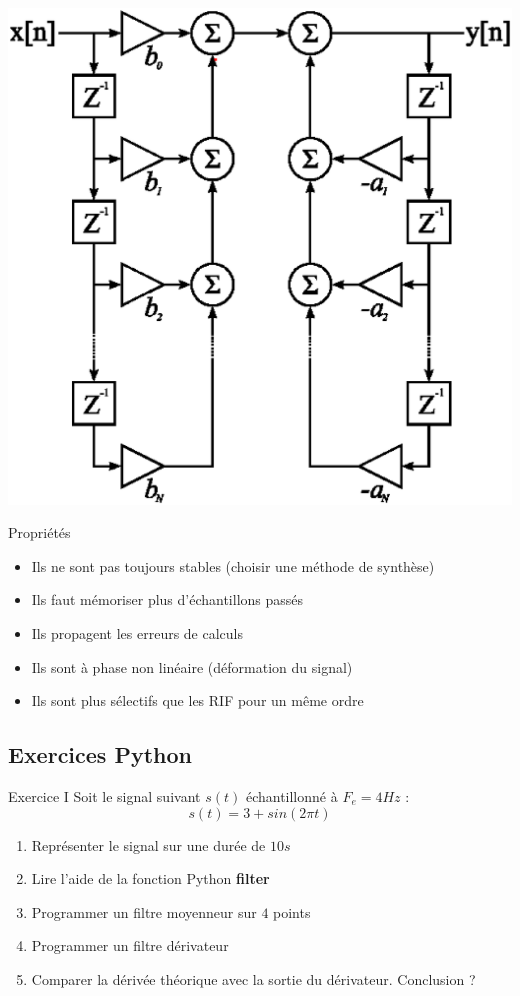 \documentclass{beamer}
\begin{document}
\begin{frame}
\center
\includegraphics[scale=.15]{images/FiltreRII.eps}
\begin{block}{Propriétés}
\begin{itemize}
  \item Ils ne sont pas toujours stables (choisir une méthode de synthèse)
  \item Ils faut mémoriser plus d'échantillons passés
  \item Ils propagent les erreurs de calculs
  \item Ils sont à phase non linéaire (déformation du signal)
  \item Ils sont plus sélectifs que les RIF pour un même ordre
\end{itemize}
\end{block}
\end{frame}

\subsection{Exercices Python}
\begin{frame}
\begin{exampleblock}{Exercice I}
Soit le signal suivant $s(t)$ échantillonné à $F_e=4Hz$ :
$$s(t) = 3 + sin(2\pi t)$$ 
\begin{enumerate}
  \item Représenter le signal sur une durée de $10s$
  \item Lire l'aide de la fonction Python \textbf{filter}
  \item Programmer un filtre moyenneur sur $4$ points
  \item Programmer un filtre dérivateur
  \item Comparer la dérivée théorique avec la sortie du dérivateur. Conclusion ?
\end{enumerate}
\end{exampleblock}
\end{frame}
\end{document}
